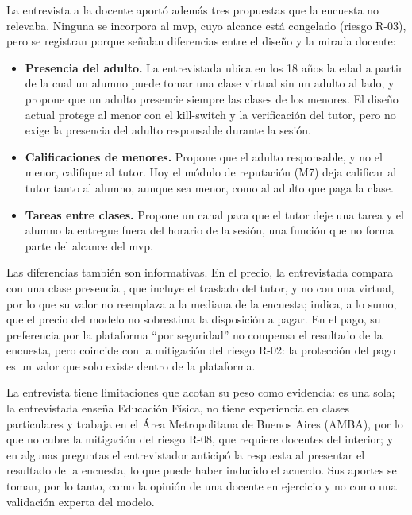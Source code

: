 La entrevista a la docente aportó además tres propuestas que la encuesta no relevaba.
Ninguna se incorpora al \gls{mvp}, cuyo alcance está congelado (riesgo
R-03), pero se registran porque señalan diferencias entre el diseño y la
mirada docente:

\begin{itemize}
    \item \textbf{Presencia del adulto.} La entrevistada ubica en los 18
          años la edad a partir de la cual un alumno puede tomar una clase
          virtual sin un adulto al lado, y propone que un adulto presencie
          siempre las clases de los menores. El diseño actual protege al
          menor con el kill-switch y la verificación del tutor, pero no
          exige la presencia del adulto responsable durante la sesión.
    \item \textbf{Calificaciones de menores.} Propone que el adulto
          responsable, y no el menor, califique al tutor. Hoy el
          módulo de reputación (M7) deja calificar al tutor tanto al
          alumno, aunque sea menor, como al adulto que paga la clase.
    \item \textbf{Tareas entre clases.} Propone un canal para que el tutor
          deje una tarea y el alumno la entregue fuera del horario de la
          sesión, una función que no forma parte del alcance del
          \gls{mvp}.
\end{itemize}

Las diferencias también son informativas. En el precio, la entrevistada
compara con una clase presencial, que incluye el traslado del tutor, y
no con una virtual, por lo que su valor no reemplaza a la mediana de la
encuesta; indica, a lo sumo, que el precio del modelo no sobrestima la
disposición a pagar. En el pago, su preferencia por la plataforma ``por
seguridad'' no compensa el resultado de la encuesta, pero coincide con
la mitigación del riesgo R-02: la protección del pago es un valor que
solo existe dentro de la plataforma.

La entrevista tiene limitaciones que acotan su peso como evidencia: es
una sola; la entrevistada enseña Educación Física, no tiene experiencia
en clases particulares y trabaja en el Área Metropolitana de Buenos Aires (AMBA), por lo que no cubre la
mitigación del riesgo R-08, que requiere docentes del interior; y en algunas
preguntas el entrevistador anticipó la respuesta al presentar el
resultado de la encuesta, lo que puede haber inducido el acuerdo. Sus
aportes se toman, por lo tanto, como la opinión de una docente en
ejercicio y no como una validación experta del modelo.

